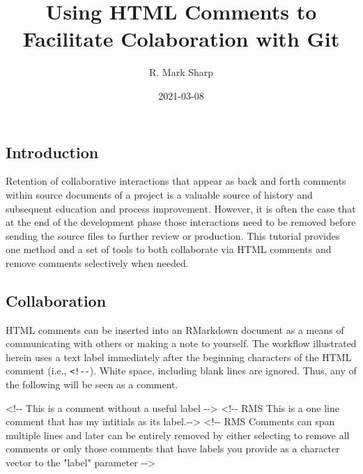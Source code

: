 \documentclass[
]{article}
\title{Using HTML Comments to Facilitate Colaboration with Git}
\author{R. Mark Sharp}
\date{2021-03-08}
\newenvironment{Shaded}{\begin{snugshade}}{\end{snugshade}}
\newcommand{\AttributeTok}[1]{\textcolor[rgb]{0.77,0.63,0.00}{#1}}
\newcommand{\StringTok}[1]{\textcolor[rgb]{0.31,0.60,0.02}{#1}}
\begin{document}
\maketitle

{
\setcounter{tocdepth}{2}
\tableofcontents
}
\hypertarget{introduction}{%
\subsection{Introduction}\label{introduction}}

Retention of collaborative interactions that appear as back and forth
comments within source documents of a project is a valuable source of
history and subsequent education and process improvement. However, it is
often the case that at the end of the development phase those
interactions need to be removed before sending the source files to
further review or production. This tutorial provides one method and a
set of tools to both collaborate via HTML comments and remove comments
selectively when needed.

\hypertarget{collaboration}{%
\subsection{Collaboration}\label{collaboration}}

HTML comments can be inserted into an RMarkdown document as a means of
communicating with others or making a note to yourself. The workflow
illustrated herein uses a text label immediately after the beginning
characters of the HTML comment (i.e., \texttt{\textless{}!-\/-}). White
space, including blank lines are ignored. Thus, any of the following
will be seen as a comment.

\begin{Shaded}
\begin{Highlighting}[]
\StringTok{\textasciigrave{}}\AttributeTok{\textless{}!{-}{-} This is a comment without a useful label {-}{-}\textgreater{}}\StringTok{\textasciigrave{}}
\StringTok{\textasciigrave{}}\AttributeTok{\textless{}!{-}{-} RMS This is a one line comment that has my intitials as its label.{-}{-}\textgreater{}}\StringTok{\textasciigrave{}}
\StringTok{\textasciigrave{}}\AttributeTok{\textless{}!{-}{-}}
\AttributeTok{RMS Comments can span multiple lines and later can be entirely removed by}
\AttributeTok{either selecting to remove all comments or only those comments that have}
\AttributeTok{labels you provide as a character vector to the "label" parameter}
\AttributeTok{{-}{-}\textgreater{}}\StringTok{\textasciigrave{}}
\end{Highlighting}
\end{Shaded}
\end{document}
